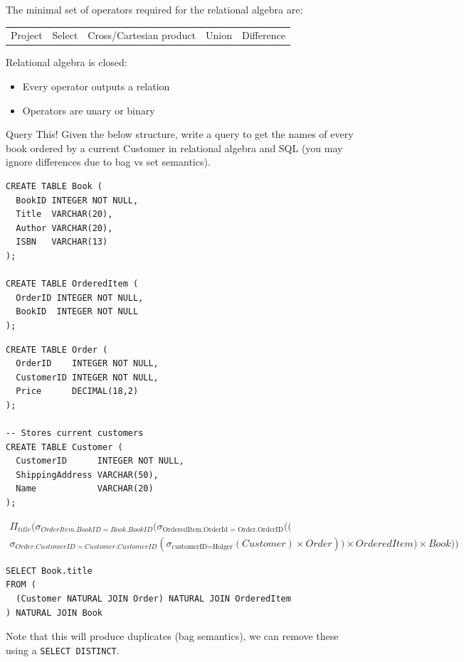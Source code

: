The minimal set of operators required for the relational algebra are:
\begin{center}
    \begin{tabular}{c c c c c}
        Project & Select & Cross/Cartesian product & Union & Difference \\
    \end{tabular}
\end{center}
Relational algebra is closed:
\begin{itemize}
  \item Every operator outputs a relation
  \item Operators are unary or binary
\end{itemize}

\begin{examplebox}{Query This!}
  Given the below structure, write a query to get the names of every book ordered by a current Customer in relational algebra and SQL (you may ignore differences due to bag vs set semantics).
  \begin{center}
    \begin{minipage}{.49\textwidth}
      \begin{verbatim}
CREATE TABLE Book (
  BookID INTEGER NOT NULL,
  Title  VARCHAR(20),
  Author VARCHAR(20),
  ISBN   VARCHAR(13)
);

CREATE TABLE OrderedItem (
  OrderID INTEGER NOT NULL,
  BookID  INTEGER NOT NULL
);

      \end{verbatim}
    \end{minipage} \hfill \begin{minipage}{.49\textwidth}
      \begin{verbatim}
CREATE TABLE Order (
  OrderID    INTEGER NOT NULL,
  CustomerID INTEGER NOT NULL,
  Price      DECIMAL(18,2)
);

-- Stores current customers
CREATE TABLE Customer (
  CustomerID      INTEGER NOT NULL,
  ShippingAddress VARCHAR(50),
  Name            VARCHAR(20) 
);
      \end{verbatim} 
    \end{minipage}
  \end{center}
  \tcblower
  \begin{multline*}
    \Pi_{title}(\sigma_{OrderItem.BookID = Book.BookID}(\sigma_{\text{OrderedItem.OrderId = Order.OrderID}}(( \\ \sigma_{Order.CustomerID = Customer.CustomerID}(\sigma_{\text{customerID=Holger}}(Customer) \times Order)) \times OrderedItem) \times Book))
  \end{multline*}
  \begin{verbatim}
SELECT Book.title
FROM (
  (Customer NATURAL JOIN Order) NATURAL JOIN OrderedItem
) NATURAL JOIN Book
  \end{verbatim}
  Note that this will produce duplicates (bag semantics), we can remove these using a \texttt{SELECT DISTINCT}.
\end{examplebox}

